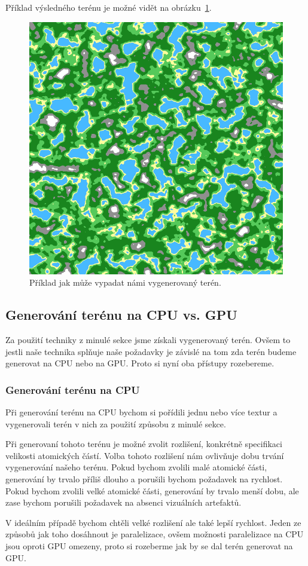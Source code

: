 Příklad výsledného terénu je možné vidět na obrázku~\ref{fig:terrain}.

\begin{figure}[!htb]
    \centering
    \includegraphics[width=0.66\linewidth]{img/terrain.png}
    \caption{Příklad jak může vypadat námi vygenerovaný terén.}
    \label{fig:terrain}
\end{figure}

\subsection{Generování terénu na CPU vs. GPU}
Za použití techniky z minulé sekce jsme získali vygenerovaný terén. Ovšem to jestli naše technika splňuje naše požadavky je závislé na tom zda terén budeme generovat na CPU nebo na GPU. Proto si nyní oba přístupy rozebereme.

\subsubsection{Generování terénu na CPU}
Při generování terénu na CPU bychom si pořídili jednu nebo více textur a vygenerovali terén v nich za použití způsobu z minulé sekce.

Při generovaní tohoto terénu je možné zvolit rozlišení, konkrétně specifikaci velikosti atomických částí. Volba tohoto rozlišení nám ovlivňuje dobu trvání vygenerování našeho terénu. Pokud bychom zvolili malé atomické části, generování by trvalo příliš dlouho a porušili bychom požadavek na rychlost. Pokud bychom zvolili velké atomické části, generování by trvalo menší dobu, ale zase bychom porušili požadavek na absenci vizuálních artefaktů.

V ideálním případě bychom chtěli velké rozlišení ale také lepší rychlost. Jeden ze způsobů jak toho dosáhnout je paralelizace, ovšem možnosti paralelizace na CPU jsou oproti GPU omezeny, proto si rozeberme jak by se dal terén generovat na GPU.

